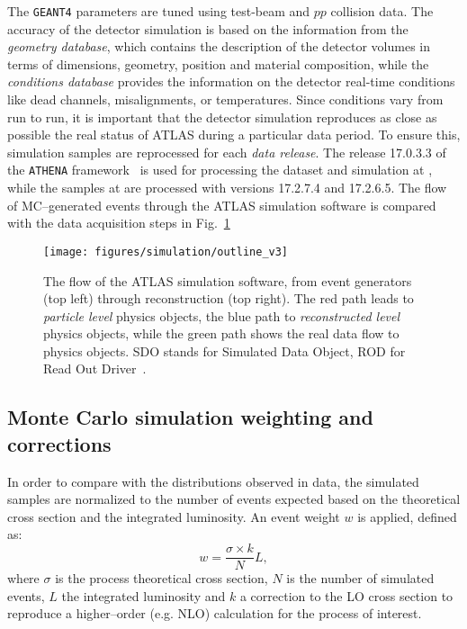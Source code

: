 The \texttt{GEANT4} parameters are tuned using test-beam and $pp$
collision data. The accuracy of the detector simulation is based on
the information from the {\it geometry database}, which contains the
description of the detector volumes in terms of dimensions, geometry,
position and material composition, while the {\it conditions database}
provides the information on the detector real-time conditions like
dead channels, misalignments, or temperatures. Since conditions vary
from run to run, it is important that the detector simulation
reproduces as close as possible the real status of ATLAS during a
particular data period. To ensure this, simulation samples are
reprocessed for each {\it data release}. 
The release 17.0.3.3 of the \texttt{ATHENA}
framework~\cite{Calafiura:865624} is used for processing the dataset
and simulation at \seventev{}, while the samples at \eighttev{} are
processed with versions 17.2.7.4 and 17.2.6.5.
The flow of MC--generated events through the ATLAS simulation software
is compared with the data acquisition steps in Fig.~\ref{fig:outline}
\begin{figure}[htb]\begin{center}
    \texttt{[image: figures/simulation/outline\_v3]}
    \caption{The flow of the ATLAS simulation software, from event
      generators (top left) through reconstruction (top right). The
      red path leads to {\it particle level} physics objects, the blue
      path to  {\it reconstructed level} physics objects, while the
      green path shows the real data flow to physics objects. SDO
      stands for Simulated Data Object, ROD for Read Out
      Driver~\cite{atlas_sim}.\label{fig:outline}} 
\end{center}\end{figure}

\subsection{Monte Carlo simulation weighting and corrections}
\label{sec:mcweights}

In order to compare with the distributions observed in data, the
simulated samples are normalized to the number of events expected
based on the theoretical cross section and the integrated luminosity.
An event weight $w$ is applied, defined as:
\begin{equation}\label{eq:mcweight}
w = \dfrac{\sigma\times k}{N} L,
\end{equation}
where $\sigma$ is the process theoretical cross section, $N$ is the
number of simulated events, $L$ the integrated luminosity and $k$ a
correction to the LO cross section to reproduce a higher--order
(e.g. NLO) calculation for the process of interest.

